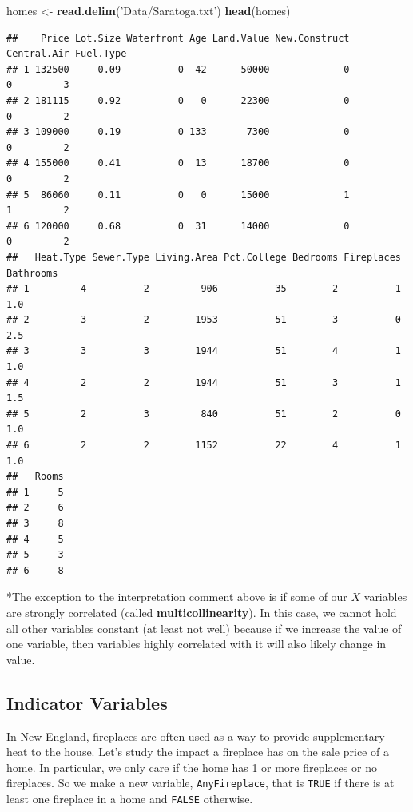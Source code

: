 \documentclass[
]{book}
\newenvironment{Shaded}{\begin{snugshade}}{\end{snugshade}}
\newcommand{\KeywordTok}[1]{\textcolor[rgb]{0.13,0.29,0.53}{\textbf{#1}}}
\newcommand{\NormalTok}[1]{#1}
\newcommand{\StringTok}[1]{\textcolor[rgb]{0.31,0.60,0.02}{#1}}
\begin{document}
\begin{Shaded}
\begin{Highlighting}[]
\NormalTok{homes <-}\StringTok{ }\KeywordTok{read.delim}\NormalTok{(}\StringTok{'Data/Saratoga.txt'}\NormalTok{)}
\KeywordTok{head}\NormalTok{(homes)}
\end{Highlighting}
\end{Shaded}

\begin{verbatim}
##    Price Lot.Size Waterfront Age Land.Value New.Construct Central.Air Fuel.Type
## 1 132500     0.09          0  42      50000             0           0         3
## 2 181115     0.92          0   0      22300             0           0         2
## 3 109000     0.19          0 133       7300             0           0         2
## 4 155000     0.41          0  13      18700             0           0         2
## 5  86060     0.11          0   0      15000             1           1         2
## 6 120000     0.68          0  31      14000             0           0         2
##   Heat.Type Sewer.Type Living.Area Pct.College Bedrooms Fireplaces Bathrooms
## 1         4          2         906          35        2          1       1.0
## 2         3          2        1953          51        3          0       2.5
## 3         3          3        1944          51        4          1       1.0
## 4         2          2        1944          51        3          1       1.5
## 5         2          3         840          51        2          0       1.0
## 6         2          2        1152          22        4          1       1.0
##   Rooms
## 1     5
## 2     6
## 3     8
## 4     5
## 5     3
## 6     8
\end{verbatim}

*The exception to the interpretation comment above is if some of our \(X\) variables are strongly correlated (called \textbf{multicollinearity}). In this case, we cannot hold all other variables constant (at least not well) because if we increase the value of one variable, then variables highly correlated with it will also likely change in value.

\hypertarget{indicator-variables}{%
\subsection{Indicator Variables}\label{indicator-variables}}

In New England, fireplaces are often used as a way to provide supplementary heat to the house. Let's study the impact a fireplace has on the sale price of a home. In particular, we only care if the home has 1 or more fireplaces or no fireplaces. So we make a new variable, \texttt{AnyFireplace}, that is \texttt{TRUE} if there is at least one fireplace in a home and \texttt{FALSE} otherwise.
\end{document}
